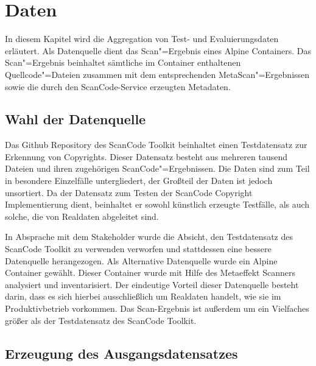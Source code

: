 \chapter{Daten}\label{ch:daten}

In diesem Kapitel wird die Aggregation von Test- und Evaluierungsdaten erläutert.
Als Datenquelle dient das Scan"=Ergebnis eines Alpine Containers.
Das Scan"=Ergebnis beinhaltet sämtliche im Container enthaltenen Quellcode"=Dateien zusammen mit dem entsprechenden MetaScan"=Ergebnissen sowie die durch den ScanCode-Service erzeugten Metadaten.

\section{Wahl der Datenquelle}\label{sec:wahl-der-datenquelle}

Das Github Repository des ScanCode Toolkit beinhaltet einen Testdatensatz zur Erkennung von Copyrights.
Dieser Datensatz besteht aus mehreren tausend Dateien und ihren zugehörigen ScanCode"=Ergebnissen.
Die Daten sind zum Teil in besondere Einzelfälle untergliedert, der Großteil der Daten ist jedoch unsortiert.
Da der Datensatz zum Testen der ScanCode Copyright Implementierung dient, beinhaltet er sowohl künstlich erzeugte Testfälle, als auch solche, die von Realdaten abgeleitet sind.

In Absprache mit dem Stakeholder wurde die Absicht, den Testdatensatz des ScanCode Toolkit zu verwenden verworfen und stattdessen eine bessere Datenquelle herangezogen.
Als Alternative Datenquelle wurde ein Alpine Container gewählt.
Dieser Container wurde mit Hilfe des Metaeffekt Scanners analysiert und inventarisiert.
Der eindeutige Vorteil dieser Datenquelle besteht darin, dass es sich hierbei ausschließlich um Realdaten handelt, wie sie im Produktivbetrieb vorkommen.
Das Scan-Ergebnis ist außerdem um ein Vielfaches größer als der Testdatensatz des ScanCode Toolkit.

\section{Erzeugung des Ausgangsdatensatzes}\label{sec:erzeugung-datensatz}

